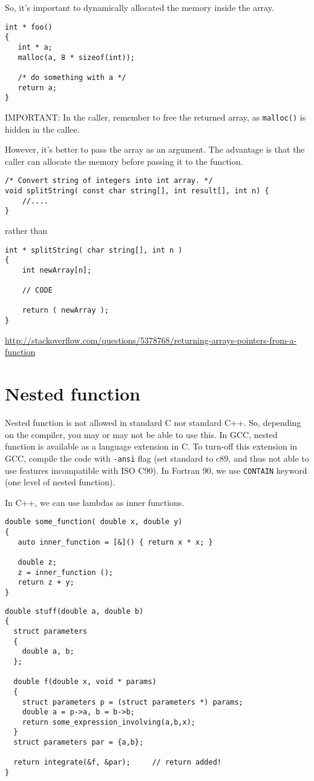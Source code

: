 So, it's important to dynamically allocated the
memory inside the array.
\begin{verbatim}
int * foo()
{
   int * a;
   malloc(a, 8 * sizeof(int));
   
   /* do something with a */
   return a;
}
\end{verbatim}
IMPORTANT: In the caller, remember to free the returned array, as
\verb!malloc()! is hidden in the callee. 

However, it's better to pass the array as an argument. The advantage is that the
caller can allocate the memory before passing it to the function.
\begin{verbatim}
/* Convert string of integers into int array. */
void splitString( const char string[], int result[], int n) {
    //....
}
\end{verbatim}
rather than
\begin{verbatim}
int * splitString( char string[], int n )
{
    int newArray[n];

    // CODE

    return ( newArray );
}
\end{verbatim}
\url{http://stackoverflow.com/questions/5378768/returning-arrays-pointers-from-a-function}


\section{Nested function}

Nested function is not allowed in standard C nor standard C++. So, depending on
the compiler, you may or may not be able to use this. In GCC, nested function is
available as a language extension in C. To turn-off this extension in GCC,
compile the code with \verb!-ansi! flag (set standard to c89, and thus not able to use
features incompatible with ISO C90). In Fortran 90, we use \verb!CONTAIN!
keyword (one level of nested function).

\begin{framed}
In C++, we can use lambdas as inner functions.

\begin{verbatim}
double some_function( double x, double y)
{
   auto inner_function = [&]() { return x * x; }

   double z;
   z = inner_function ();
   return z + y;
}
\end{verbatim}
\end{framed}

\begin{verbatim}
double stuff(double a, double b)
{
  struct parameters
  {
    double a, b;
  };

  double f(double x, void * params)
  {
    struct parameters p = (struct parameters *) params;
    double a = p->a, b = b->b;
    return some_expression_involving(a,b,x);
  }
  struct parameters par = {a,b};

  return integrate(&f, &par);     // return added!
}
\end{verbatim}

